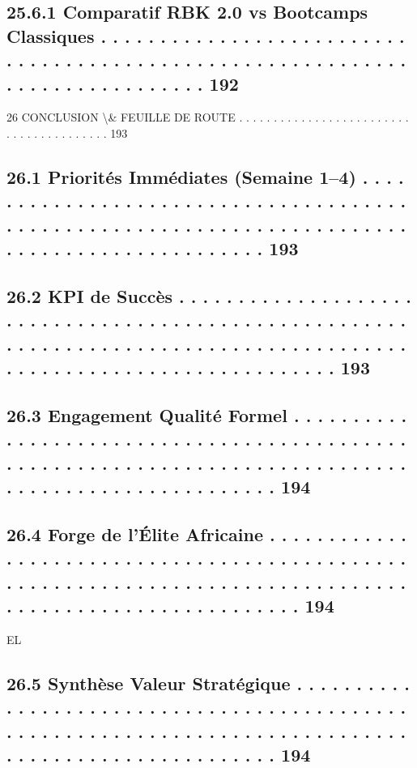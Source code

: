 \subsection{25.6.1              Comparatif RBK 2.0 vs Bootcamps Classiques . . . . . . . . . . . . . . . . . . . . . . . . . . . . . . . . . . . . . . . . . . . . . . . . . . . . . . . . . . . . . . . . . . . . . . . . . . . . . 192}
\vspace{0.5em}
26    CONCLUSION \textbackslash{}& FEUILLE DE ROUTE . . . . . . . . . . . . . . . . . . . . . . . . . . . . . . . . . . . . . . . . 193\\
\subsection{26.1    Priorités Immédiates (Semaine 1–4) . . . . . . . . . . . . . . . . . . . . . . . . . . . . . . . . . . . . . . . . . . . . . . . . . . . . . . . . . . . . . . . . . . . . . . . . . . . . . . . . . . . . . . . . . . . . . . 193}
\subsection{26.2    KPI de Succès . . . . . . . . . . . . . . . . . . . . . . . . . . . . . . . . . . . . . . . . . . . . . . . . . . . . . . . . . . . . . . . . . . . . . . . . . . . . . . . . . . . . . . . . . . . . . . . . . . . . . . . . . . . . . . . . . . . . 193}
\subsection{26.3    Engagement Qualité Formel . . . . . . . . . . . . . . . . . . . . . . . . . . . . . . . . . . . . . . . . . . . . . . . . . . . . . . . . . . . . . . . . . . . . . . . . . . . . . . . . . . . . . . . . . . . . . . . . . . . . . 194}
\subsection{26.4    Forge de l’Élite Africaine . . . . . . . . . . . . . . . . . . . . . . . . . . . . . . . . . . . . . . . . . . . . . . . . . . . . . . . . . . . . . . . . . . . . . . . . . . . . . . . . . . . . . . . . . . . . . . . . . . . . . . . . . 194}
\vspace{0.5em}
\vspace{0.5em}
\vspace{0.5em}
\vspace{0.5em}
EL\\
\subsection{26.5    Synthèse Valeur Stratégique . . . . . . . . . . . . . . . . . . . . . . . . . . . . . . . . . . . . . . . . . . . . . . . . . . . . . . . . . . . . . . . . . . . . . . . . . . . . . . . . . . . . . . . . . . . . . . . . . . . . . 194}
